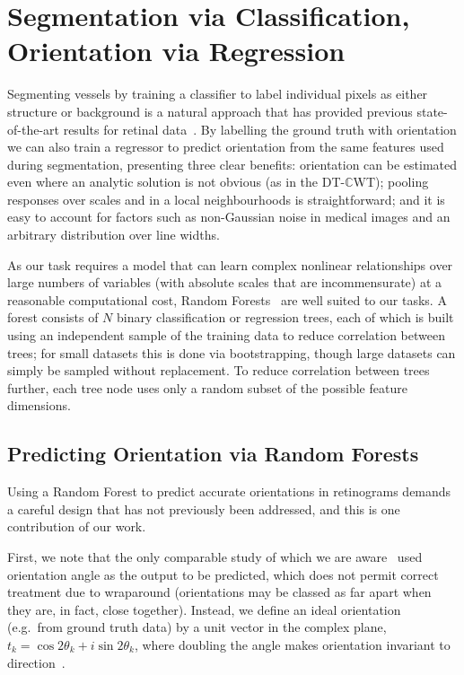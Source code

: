\documentclass[runningheads,a4paper]{llncs}
\def\dtcwt{DT-$\mathbb{C}$WT}
\def\eg{e.g.}
\begin{document}
\section{Segmentation via Classification, Orientation via Regression}
\label{s:learning}
Segmenting vessels by training a classifier to label individual pixels as either structure or background is a natural approach that has provided previous state-of-the-art results for retinal data~\cite{Staal_etal_TMI04}. By labelling the ground truth with orientation we can also train a regressor to predict orientation from the same features used during segmentation, presenting three clear benefits: orientation can be estimated even where an analytic solution is not obvious (as in the \dtcwt{}); pooling responses over scales and in a local neighbourhoods is straightforward; and it is easy to account for factors such as non-Gaussian noise in medical images and an arbitrary distribution over line widths.

As our task requires a model that can learn complex nonlinear relationships over large numbers of variables (with absolute scales that are incommensurate) at a reasonable computational cost, Random Forests~\cite{Breiman_ML01} are well suited to our tasks. A forest consists of $N$ binary classification or regression trees, each of which is built using an independent sample of the training data to reduce correlation between trees; for small datasets this is done via bootstrapping, though large datasets can simply be sampled without replacement. To reduce correlation between trees further, each tree node uses only a random subset of the possible feature dimensions.

\subsection{Predicting Orientation via Random Forests}
Using a Random Forest to predict accurate orientations in retinograms demands a careful design that has not previously been addressed, and this is one contribution of our work.

First, we note that the only comparable study of which we are aware~\cite{Berks_etal_IPMI11} used orientation angle as the output to be predicted, which does not permit correct treatment due to wraparound (orientations may be classed as far apart when they are, in fact, close together). Instead, we define an ideal orientation (\eg~from ground truth data) by a unit vector in the complex plane, $t_k = \cos 2\theta_k + i\sin 2\theta_k$, where doubling the angle makes orientation invariant to direction~\cite{Mardia_Jupp_00}.
\end{document}
